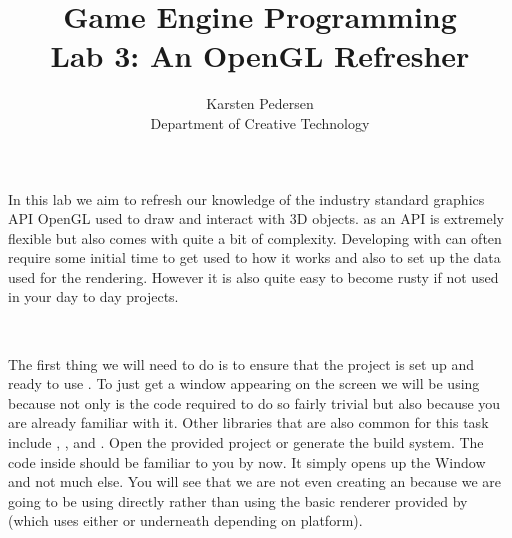 \documentclass[10pt]{article}
\begin{document}
\title{Game Engine Programming \\
  \large Lab 3: An OpenGL Refresher}

\author{Karsten Pedersen\\ Department of Creative Technology}
\maketitle

In this lab we aim to refresh our knowledge of the industry
standard graphics API OpenGL used to draw and interact with 3D
objects.  as an API is extremely flexible but also comes
with quite a bit of complexity.  Developing with  can often
require some initial time to get used to how it works and also to set
up the data used for the rendering. However it is also quite easy to
become rusty if not used in your day to day projects.

\

The first thing we will need to do is to ensure that the project is
set up and ready to use . To just get a window appearing
on the screen we will be using  because not only is the code
required to do so fairly trivial but also because you are already familiar
with it.  Other libraries that are also common for this task include
, ,  and . Open
the provided  project or generate
the  build system.  The code inside 
should be familiar to you by now. It simply opens up the 
Window and not much else.  You will see that we are not even creating an
 because we are going to be using 
directly rather than using the basic renderer provided by 
(which uses either  or  underneath depending
on platform).

\end{document}
